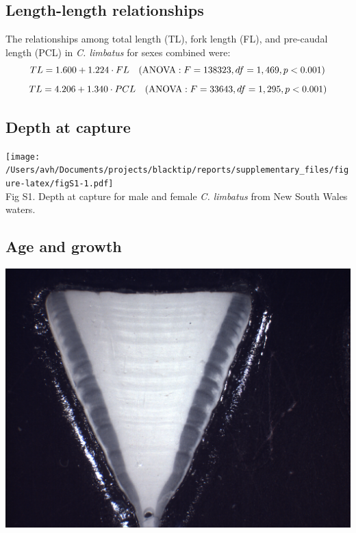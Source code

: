 \documentclass[]{article}
\title{}
\author{}
\date{}
\begin{document}
\hypertarget{length-length-relationships}{%
\subsection{Length-length
relationships}\label{length-length-relationships}}

The relationships among total length (TL), fork length (FL), and
pre-caudal length (PCL) in \emph{C. limbatus} for sexes combined were:
\[TL = 1.600 + 1.224 \cdot FL \quad (\textup{ANOVA}: F = 138323, df = 1, 469, p < 0.001) \]
\[TL = 4.206 + 1.340 \cdot PCL \quad (\textup{ANOVA}: F = 33643, df = 1, 295, p < 0.001)\]

\hypertarget{depth-at-capture}{%
\subsection{Depth at capture}\label{depth-at-capture}}

\texttt{[image: /Users/avh/Documents/projects/blacktip/reports/supplementary\_files/figure-latex/figS1-1.pdf]}\\
Fig S1. Depth at capture for male and female \emph{C. limbatus} from New
South Wales waters.

\newpage

\hypertarget{age-and-growth}{%
\subsection{Age and growth}\label{age-and-growth}}

\includegraphics{../data/KH021208-8.png}
\end{document}
